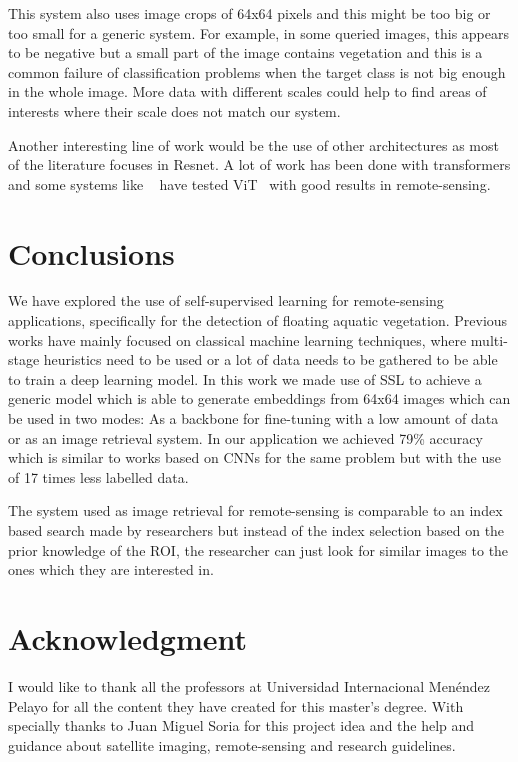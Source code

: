 \documentclass[conference]{IEEEtran}
\begin{document}
    This system also uses image crops of 64x64 pixels and this might be too big or too small for a generic system.
    For example, in some queried images, this appears to be negative but a small part of the image contains vegetation and this is a common failure of classification problems
    when the target class is not big enough in the whole image.
    More data with different scales could help to find areas of interests where their scale does not match our system.

    Another interesting line of work would be the use of other architectures as most of the literature focuses in Resnet.
    A lot of work has been done with transformers and some systems like ~\citet{wang2023ssl4eos12, li2022efficient} have tested ViT~\cite{dosovitskiy2021image} with good results in remote-sensing.


    \section{Conclusions}

    We have explored the use of self-supervised learning for remote-sensing applications, specifically for the detection of floating aquatic vegetation.
    Previous works have mainly focused on classical machine learning techniques, where multi-stage heuristics need to be used or a lot of data needs
    to be gathered to be able to train a deep learning model.
    In this work we made use of SSL to achieve a generic model which is able to generate embeddings from 64x64 images which can be used in two modes:
    As a backbone for fine-tuning with a low amount of data or as an image retrieval system.
    In our application we achieved 79\% accuracy which is similar to works based on CNNs for the same problem but with the use of 17 times less labelled data.

    The system used as image retrieval for remote-sensing is comparable to an index based search made by researchers but instead of the index selection based
    on the prior knowledge of the ROI, the researcher can just look for similar images to the ones which they are interested in.

    \section*{Acknowledgment}
    I would like to thank all the professors at Universidad Internacional Menéndez Pelayo for all the content they have created for this master's degree.
    With specially thanks to Juan Miguel Soria for this project idea and the help and guidance about satellite imaging, remote-sensing and research guidelines.
\end{document}

